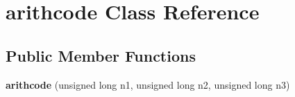 \hypertarget{classarithcode}{}\section{arithcode Class Reference}
\label{classarithcode}
\subsection*{Public Member Functions}
\begin{DoxyCompactItemize}
\item 
{\bfseries arithcode} (unsigned long n1, unsigned long n2, unsigned long n3)\hypertarget{classarithcode_a3440b8d7a8b101681bc386f982bd92cb}{}\label{classarithcode_a3440b8d7a8b101681bc386f982bd92cb}

\end{DoxyCompactItemize}
